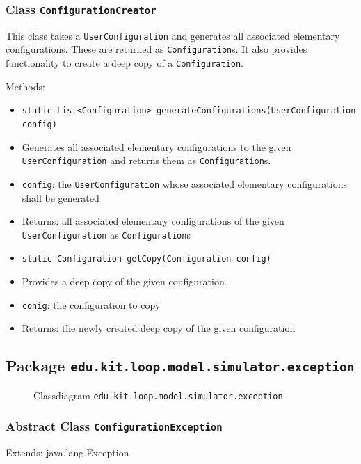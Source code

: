 \documentclass[parskip=full,11pt]{scrartcl}
\begin{document}
\subsubsection{Class \texttt{ConfigurationCreator}}
This class takes a \texttt{UserConfiguration} and generates all associated elementary configurations. These are returned as \texttt{Configuration}s. It also provides functionality to create a deep copy of a \texttt{Configuration}.

Methods:
\begin{itemize}\itemsep -10pt
\item \texttt{static List<Configuration> generateConfigurations(UserConfiguration config)}
\item[] Generates all associated elementary configurations to the given \texttt{UserConfiguration} and returns them as \texttt{Configuration}s.
\item[] \texttt{config}: the \texttt{UserConfiguration} whose associated elementary configurations shall be generated
\item[] Returns: all associated elementary configurations of the given \texttt{UserConfiguration} as \texttt{Configuration}s

\item \texttt{static Configuration getCopy(Configuration config)}
\item[] Provides a deep copy of the given configuration.
\item[] \texttt{conig}: the configuration to copy
\item[] Returns: the newly created deep copy of the given configuration
\end{itemize}

\subsection{Package \texttt{edu.kit.loop.model.simulator.exception}}
\iftrue
\begin{figure}[h]
	\centering
	\fontsize{7}{8}\selectfont
	

	\caption{Classdiagram \texttt{edu.kit.loop.model.simulator.exception}}
\end{figure}
\fi
\subsubsection{Abstract Class \texttt{ConfigurationException }}
Extends: java.lang.Exception
\end{document}
